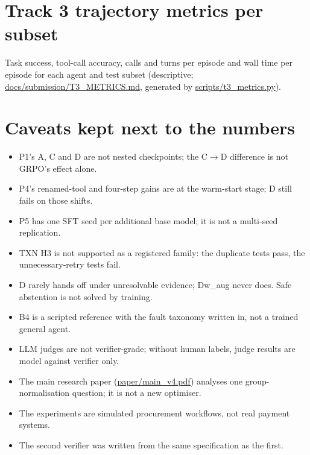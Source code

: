 \documentclass[11pt]{article}
\begin{document}
\section{Track 3 trajectory metrics per subset}
\label{app:t3}
Task success, tool-call accuracy, calls and turns per episode and wall time per episode for each agent and test subset
(descriptive; \url{docs/submission/T3_METRICS.md}, generated by \url{scripts/t3_metrics.py}).


\section{Caveats kept next to the numbers}
\label{app:caveats}
\begin{itemize}
\item P1's A, C and D are not nested checkpoints; the C$\to$D difference is not GRPO's effect alone.
\item P4's renamed-tool and four-step gains are at the warm-start stage; D still fails on those shifts.
\item P5 has one SFT seed per additional base model; it is not a multi-seed replication.
\item TXN H3 is not supported as a registered family: the duplicate tests pass, the unnecessary-retry tests fail.
\item D rarely hands off under unresolvable evidence; Dw\_aug never does. Safe abstention is not solved by training.
\item B4 is a scripted reference with the fault taxonomy written in, not a trained general agent.
\item LLM judges are not verifier-grade; without human labels, judge results are model against verifier only.
\item The main research paper (\url{paper/main_v4.pdf}) analyses one group-normalisation question; it is not a new optimiser.
\item The experiments are simulated procurement workflows, not real payment systems.
\item The second verifier was written from the same specification as the first.
\end{itemize}
\end{document}
